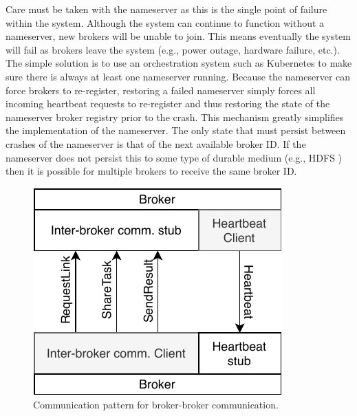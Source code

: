 \documentclass[conference]{IEEEtran}
\begin{document}
Care must be taken with the nameserver as this is the single point of failure
within the system. Although the system can continue to function without a
nameserver, new brokers will be unable to join. This means eventually the system
will fail as brokers leave the system (e.g., power outage, hardware failure, etc.).
The simple solution is to use an orchestration system such as Kubernetes to make
sure there is always at least one nameserver running. Because the nameserver
can force brokers to re-register, restoring a failed nameserver simply forces all
incoming heartbeat requests to re-register and thus restoring the state of the
nameserver broker registry prior to the crash. This mechanism greatly simplifies
the implementation of the nameserver. The only state that must persist between
crashes of the nameserver is that of the next available broker ID. If the nameserver
does not persist this to some type of durable medium (e.g., HDFS
\cite{Shvachko:2010:HDF:1913798.1914427}) then it is possible for multiple brokers
to receive the same broker ID.

\begin{figure}
  \centering
  \includegraphics{img/broker_broker}
  \caption{Communication pattern for broker-broker communication.}
  \label{fig:broker-broker}
\end{figure}
\end{document}
